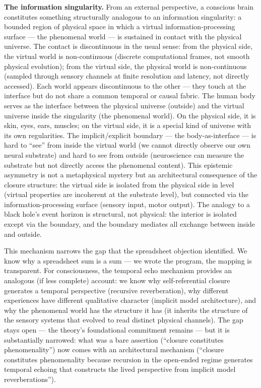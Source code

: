 \documentclass[12pt]{article}
\newcommand{\revend}{}
\begin{document}
{\textbf{The information singularity.} From an external perspective, a conscious brain constitutes something structurally analogous to an information singularity: a bounded region of physical space in which a virtual information-processing surface --- the phenomenal world --- is sustained in contact with the physical universe. The contact is discontinuous in the usual sense: from the physical side, the virtual world is non-continuous (discrete computational frames, not smooth physical evolution); from the virtual side, the physical world is non-continuous (sampled through sensory channels at finite resolution and latency, not directly accessed). Each world appears discontinuous to the other --- they touch at the interface but do not share a common temporal or causal fabric. The human body serves as the interface between the physical universe (outside) and the virtual universe inside the singularity (the phenomenal world). On the physical side, it is skin, eyes, ears, muscles; on the virtual side, it is a special kind of universe with its own regularities. The implicit/explicit boundary --- the body-as-interface --- is hard to ``see'' from inside the virtual world (we cannot directly observe our own neural substrate) and hard to see from outside (neuroscience can measure the substrate but not directly access the phenomenal content). This epistemic asymmetry is not a metaphysical mystery but an architectural consequence of the closure structure: the virtual side is isolated from the physical side in level (virtual properties are incoherent at the substrate level), but connected via the information-processing surface (sensory input, motor output). The analogy to a black hole's event horizon is structural, not physical: the interior is isolated except via the boundary, and the boundary mediates all exchange between inside and outside.

This mechanism narrows the gap that the spreadsheet objection identified. We know why a spreadsheet sum is a sum --- we wrote the program, the mapping is transparent. For consciousness, the temporal echo mechanism provides an analogous (if less complete) account: we know why self-referential closure generates a temporal perspective (recursive reverberation), why different experiences have different qualitative character (implicit model architecture), and why the phenomenal world has the structure it has (it inherits the structure of the sensory systems that evolved to read distinct physical channels). The gap stays open --- the theory's foundational commitment remains --- but it is substantially narrowed: what was a bare assertion (``closure constitutes phenomenality'') now comes with an architectural mechanism (``closure constitutes phenomenality because recursion in the open-ended regime generates temporal echoing that constructs the lived perspective from implicit model reverberations'').\revend}
\end{document}
